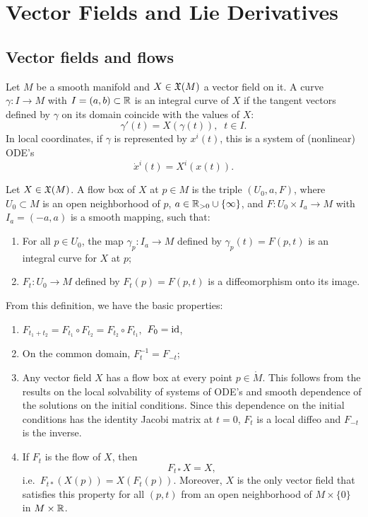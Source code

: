 \clearpage
\section{Vector Fields and Lie Derivatives}


\subsection{Vector fields and flows}


\begin{defn}
Let $M$ be a smooth manifold and $X\in\mathfrak{X}(M)$ a vector field on it. A curve $\gamma:I\to M$ with $I=(a,b)\subset\mathbb{R} $ is an integral curve of $X$ if the tangent vectors defined by $\gamma$ on its domain coincide with the values of $X$: 
\[
\gamma'(t)=X(\gamma(t)),\;\;t\in I.
\]
In local coordinates, if $\gamma$ is represented by $x^i(t)$, this is a system of (nonlinear) ODE's
\[
\dot x^i(t)=X^i(x(t)).
\]
\end{defn}
\begin{defn}
Let $X\in\mathfrak{X}(M)$. A flow box of $X$ at $p\in M$ is the triple $(U_0,a,F)$, where $U_0\subset M$ is an open neighborhood of $p$, $a\in \mathbb{R}_{>0}\cup\{\infty\}$, and $F:U_0\times I_a\to M$ with $I_a=(-a,a)$ is a smooth mapping, such that:
\begin{enumerate}
    \item For all $p\in U_0$, the map $\gamma_p:I_a\to M$ defined by $\gamma_p(t)=F(p,t)$ is an integral curve for $X$ at $p$;
    \item $F_t:U_0\to M$ defined by $F_t(p)=F(p,t)$ is a diffeomorphism onto its image.
\end{enumerate}
\end{defn}
From this definition, we have the basic properties:
\begin{enumerate}
    \item $F_{t_1+t_2}=F_{t_1}\circ F_{t_2}=F_{t_2}\circ F_{t_1},$ $F_0=\operatorname{id}$,
    \item On the common domain, $F_t^{-1}=F_{-t}$;
    \item Any vector field $X$ has a flow box at every point $p\in \mathring{M}$. This follows from the results on the local solvability of systems of ODE's and smooth dependence of the solutions on the initial conditions. Since this dependence on the initial conditions has the identity Jacobi matrix at $t=0$, $F_t$ is a local diffeo and $F_{-t}$ is the inverse.
    \item If $F_t$ is the flow of $X$, then \[F_{t\ast}X=X,\] i.e.\ $F_{t\ast}(X(p))=X(F_t(p))$. Moreover, $X$ is the only vector field that satisfies this property for all $(p,t)$ from an open neighborhood of $M\times\{0\}$ in $M\times\mathbb{R} $.
\end{enumerate}

